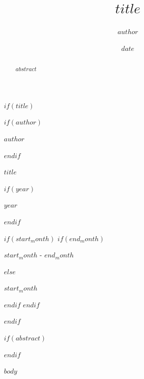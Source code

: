 \documentclass[8pt,twoside,openany]{book}
\title{$title$}
\author{$author$}
\date{$date$}
\begin{document}
\frontmatter
\pagestyle{empty}  %

$if(title)$
\begin{titlepage}
\centering

\vspace*{\fill}

$if(author)$
{\fontsize{16pt}{20pt}\selectfont $author$\par}
\vspace{1em}
$endif$

{\fontsize{30pt}{36pt}\selectfont\bfseries $title$\par}
\vspace{-0.5em}



\vspace*{\fill}
\vspace*{\fill}

$if(year)$
{\fontsize{26pt}{31pt}\selectfont\bfseries $year$\par}
\vspace{0.5em}
$endif$

$if(start_month)$
$if(end_month)$
{\fontsize{10pt}{12pt}\selectfont $start_month$ - $end_month$\par}
$else$
{\fontsize{10pt}{12pt}\selectfont $start_month$\par}
$endif$
\vspace{4em}
$endif$


\end{titlepage}
$endif$

$if(abstract)$
\begin{abstract}
$abstract$
\end{abstract}
$endif$


\mainmatter
\pagestyle{fancy}  %

$body$

\backmatter

\clearpage
\ifodd\value{page}
  \thispagestyle{empty}\mbox{}\clearpage
  \thispagestyle{empty}\mbox{}\clearpage
\else
  \thispagestyle{empty}\mbox{}\clearpage
\fi
\end{document}
